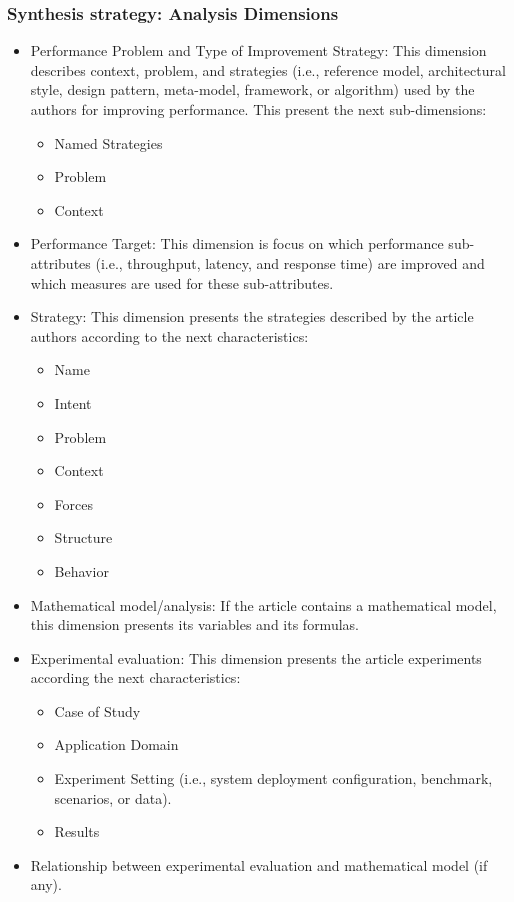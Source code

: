 \subsubsection {Synthesis strategy: Analysis Dimensions}
\begin{itemize}
	\item Performance Problem and Type of Improvement Strategy: This dimension describes context, problem, and strategies (i.e., reference model, architectural style, design pattern, meta-model, framework, or algorithm) used by the authors for improving performance. This present the next sub-dimensions:
	
	\begin{itemize}
		\item Named Strategies
		\item Problem
		\item Context
	\end{itemize}
	
	\item Performance Target: This dimension is focus on which performance sub-attributes (i.e., throughput, latency, and response time) are improved and which measures are used for these sub-attributes. 
	
	\item Strategy: This dimension presents the strategies described by the article authors according to the next characteristics:
	
	\begin{itemize}
		\item Name
		\item Intent
		\item Problem
		\item Context
		\item Forces
		\item Structure
		\item Behavior
	\end{itemize}
	
	\item Mathematical model/analysis: If the article contains a mathematical model, this dimension presents its variables and its formulas.
	
	\item Experimental evaluation: This dimension presents the article experiments according the next characteristics:
	\begin{itemize}
		\item Case of Study
		\item Application Domain
		\item Experiment Setting (i.e., system deployment configuration, benchmark, scenarios, or data).
		\item Results
	\end{itemize}
	\item Relationship between experimental evaluation and mathematical model (if any).
\end{itemize}

